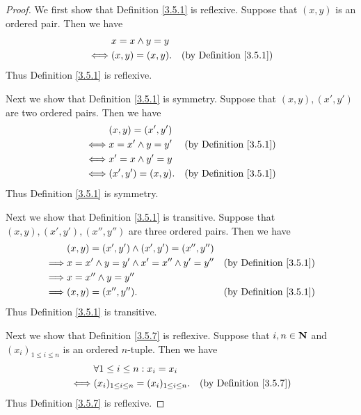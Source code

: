\begin{proof}
    We first show that Definition \ref{3.5.1} is reflexive.
    Suppose that \((x, y)\) is an ordered pair.
    Then we have
    \begin{align*}
             & x = x \land y = y                                      \\
        \iff & (x, y) = (x, y).  & \text{(by Definition \ref{3.5.1})}
    \end{align*}
    Thus Definition \ref{3.5.1} is reflexive.

    Next we show that Definition \ref{3.5.1} is symmetry.
    Suppose that \((x, y), (x', y')\) are two ordered pairs.
    Then we have
    \begin{align*}
             & (x, y) = (x', y')                                        \\
        \iff & x = x' \land y = y' & \text{(by Definition \ref{3.5.1})} \\
        \iff & x' = x \land y' = y                                      \\
        \iff & (x', y') = (x, y).  & \text{(by Definition \ref{3.5.1})}
    \end{align*}
    Thus Definition \ref{3.5.1} is symmetry.

    Next we show that Definition \ref{3.5.1} is transitive.
    Suppose that \((x, y), (x', y'), (x'', y'')\) are three ordered pairs.
    Then we have
    \begin{align*}
                 & (x, y) = (x', y') \land (x', y') = (x'', y'')                                          \\
        \implies & x = x' \land y = y' \land x' = x'' \land y' = y'' & \text{(by Definition \ref{3.5.1})} \\
        \implies & x = x'' \land y = y''                                                                  \\
        \implies & (x, y) = (x'', y'').                              & \text{(by Definition \ref{3.5.1})}
    \end{align*}
    Thus Definition \ref{3.5.1} is transitive.

    Next we show that Definition \ref{3.5.7} is reflexive.
    Suppose that \(i, n \in \mathbf{N}\) and \((x_i)_{1 \leq i \leq n}\) is an ordered \(n\)-tuple.
    Then we have
    \begin{align*}
             & \forall 1 \leq i \leq n : x_i = x_i                                                     \\
        \iff & (x_i)_{1 \leq i \leq n} = (x_i)_{1 \leq i \leq n}. & \text{(by Definition \ref{3.5.7})}
    \end{align*}
    Thus Definition \ref{3.5.7} is reflexive.


\end{proof}
